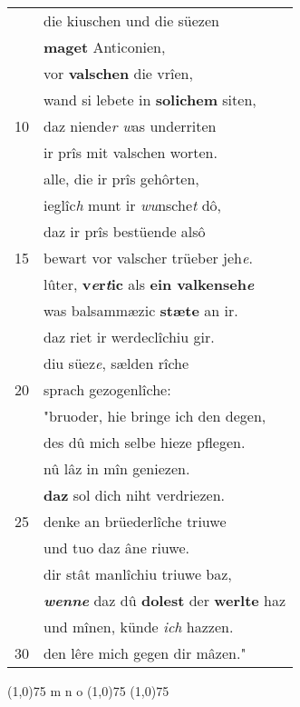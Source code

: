 \documentclass[8pt,a4paper,notitlepage]{article}
\begin{document}
\begin{table}[ht]
\begin{minipage}[t]{0.5\linewidth}
\begin{tabular}{rl}
 & die kiuschen und die süezen\\ 
 & \textbf{maget} Anticonien,\\ 
 & vor \textbf{valschen} die vrîen,\\ 
 & wand si lebete in \textbf{solichem} siten,\\ 
10 & daz niende\textit{r w}as underriten\\ 
 & ir prîs mit valschen worten.\\ 
 & alle, die ir prîs gehôrten,\\ 
 & ieglîc\textit{h} munt ir \textit{wu}nsche\textit{t} dô,\\ 
 & daz ir prîs bestüende alsô\\ 
15 & bewart vor valscher trüeber jeh\textit{e}.\\ 
 & lûter, \textbf{v\textit{e}r\textit{t}ic} als \textbf{ein valkenseh\textit{e}}\\ 
 & was balsammæzic \textbf{stæte} an ir.\\ 
 & daz riet ir werdeclîchiu gir.\\ 
 & diu süez\textit{e}, sælden rîche\\ 
20 & sprach gezogenlîche:\\ 
 & "bruoder, hie bringe ich den degen,\\ 
 & des dû mich selbe hieze pflegen.\\ 
 & nû lâz in mîn geniezen.\\ 
 & \textbf{daz} sol dich niht verdriezen.\\ 
25 & denke an brüederlîche triuwe\\ 
 & und tuo daz âne riuwe.\\ 
 & dir stât manlîchiu triuwe baz,\\ 
 & \textit{\textbf{wenne}} daz dû \textbf{dolest} der \textbf{werlte} haz\\ 
 & und mînen, künde \textit{ich} hazzen.\\ 
30 & den lêre mich gegen dir mâzen."\\ 
\end{tabular}
\scriptsize
\line(1,0){75} \newline
m n o \newline
\line(1,0){75} \newline
\newline
\line(1,0){75} \newline

\end{minipage}
\end{table}
\end{document}

